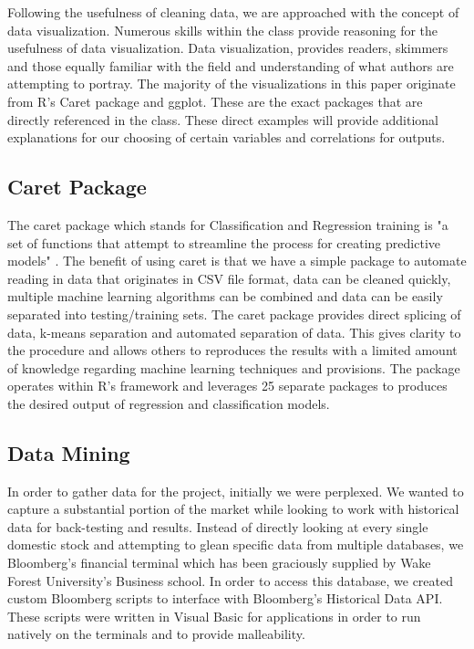 \documentclass[paper=letter, fontsize=11pt]{scrartcl}
\numberwithin{equation}{section}		%
\numberwithin{figure}{section}			%
\numberwithin{table}{section}				%
\begin{document}
\begin{spacing}{2}
Following the usefulness of cleaning data, we are approached with the concept of data visualization. Numerous skills within the class provide reasoning for the usefulness of data visualization. Data visualization, provides readers, skimmers and those equally familiar with the field and understanding of what authors are attempting to portray. The majority of the visualizations in this paper originate from R's Caret package and ggplot. These are the exact packages that are directly referenced in the class. These direct examples will provide additional explanations for our choosing of certain variables and correlations for outputs. 
\subsection{Caret Package}
The caret package which stands for Classification and Regression training is "a set of functions that attempt to streamline the process for creating predictive models" \cite{caret}. The benefit of using caret is that we have a simple package to automate reading in data that originates in CSV file format, data can be cleaned quickly, multiple machine learning algorithms can be combined and data can be easily separated into testing/training sets. The caret package provides direct splicing of data, k-means separation and automated separation of data. This gives clarity to the procedure and allows others to reproduces the results with a limited amount of knowledge regarding machine learning techniques and provisions\cite{Kuhn}. The package operates within R's framework and leverages 25 separate packages to produces the desired output of regression and classification models. 

\subsection{Data Mining}
In order to gather data for the project, initially we were perplexed. We wanted to capture a substantial portion of the market while looking to work with historical data for back-testing and results. Instead of directly looking at every single domestic stock and attempting to glean specific data from multiple databases, we Bloomberg's financial terminal which has been graciously supplied by Wake Forest University's Business school. In order to access this database, we created custom Bloomberg scripts to interface with Bloomberg's Historical Data API. These scripts were written in Visual Basic for applications in order to run natively on the terminals and to provide malleability. 



\end{spacing}
\end{document}
